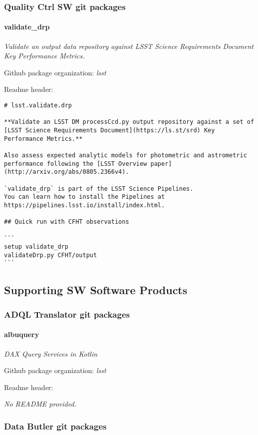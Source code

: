 \subsubsection{Quality Ctrl SW git packages}
\paragraph{validate\_drp}
\textit{Validate an output data repository against LSST Science Requirements
Document Key Performance Metrics.}

Github package organization: \textit{lsst}

Readme header:

\begin{verbatim}
# lsst.validate.drp

**Validate an LSST DM processCcd.py output repository against a set of [LSST Science Requirements Document](https://ls.st/srd) Key Performance Metrics.**

Also assess expected analytic models for photometric and astrometric performance following the [LSST Overview paper](http://arxiv.org/abs/0805.2366v4).

`validate_drp` is part of the LSST Science Pipelines.
You can learn how to install the Pipelines at https://pipelines.lsst.io/install/index.html.

## Quick run with CFHT observations

```
setup validate_drp
validateDrp.py CFHT/output
```\end{verbatim}

\subsection{Supporting SW Software Products}
\subsubsection{ADQL Translator git packages}
\paragraph{albuquery}
\textit{DAX Query Services in Kotlin}

Github package organization: \textit{lsst}

Readme header:

\textit{No README provided.}

\subsubsection{Data Butler git packages}
